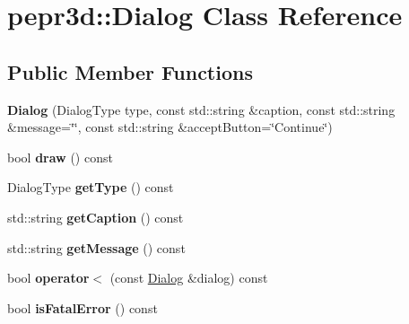 \hypertarget{classpepr3d_1_1_dialog}{}\section{pepr3d\+::Dialog Class Reference}
\label{classpepr3d_1_1_dialog}
\subsection*{Public Member Functions}
\begin{DoxyCompactItemize}
\item 
\mbox{\label{classpepr3d_1_1_dialog_a76e84fe63c48e1598340732b4973e051}} 
{\bfseries Dialog} (Dialog\+Type type, const std\+::string \&caption, const std\+::string \&message=\char`\"{}\char`\"{}, const std\+::string \&accept\+Button=\char`\"{}Continue\char`\"{})
\item 
\mbox{\label{classpepr3d_1_1_dialog_a45181133f311f1f19c30242b18d69e74}} 
bool {\bfseries draw} () const
\item 
\mbox{\label{classpepr3d_1_1_dialog_a3634fe3a89e32eeb2758cabf556e8f86}} 
Dialog\+Type {\bfseries get\+Type} () const
\item 
\mbox{\label{classpepr3d_1_1_dialog_a176eac0bbf832b8688ebbd9f62c75bc0}} 
std\+::string {\bfseries get\+Caption} () const
\item 
\mbox{\label{classpepr3d_1_1_dialog_ae355e45bb6a9d50ddaa2e83b16ae45e2}} 
std\+::string {\bfseries get\+Message} () const
\item 
\mbox{\label{classpepr3d_1_1_dialog_a5d81c6ce2dad14e34ebdb553e84023b4}} 
bool {\bfseries operator$<$} (const \mbox{\hyperlink{classpepr3d_1_1_dialog}{Dialog}} \&dialog) const
\item 
\mbox{\label{classpepr3d_1_1_dialog_a6e8161d42cbe0d944c17a3654c488b9a}} 
bool {\bfseries is\+Fatal\+Error} () const
\end{DoxyCompactItemize}
